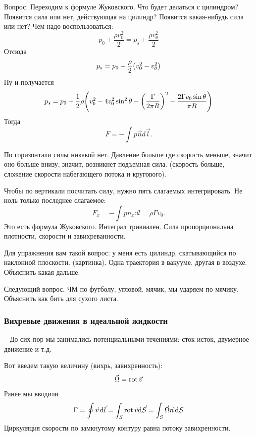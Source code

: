 Вопрос. Переходим к формуле Жуковского. Что будет делаться с цилиндром? Появится сила или нет, действующая на цилиндр? Появится какая-нибудь сила или нет? Чем надо воспользоваться:
\begin{equation}
	p_0+\frac{\rho v_0^2}{2}=p_s+\frac{\rho v_\theta^2}{2}
\end{equation}
Отсюда
\begin{equation}
	p_s=p_0+\frac{\rho}{2}\qty(v_0^2-v_\theta^2)
\end{equation}
Ну и получается
\begin{equation}
	p_s=p_0+\frac12\rho\qty(v_0^2-4v_0^2\sin^2\theta-\qty(\frac{\Gamma}{2\pi R})^2-\frac{2\Gamma v_0\sin\theta}{\pi R})
\end{equation}
Тогда
\begin{equation}
	F=-\int p\vec{n}d\vec{l}.
\end{equation}

По горизонтали силы никакой нет. Давление больше где скорость меньше, значит оно больше внизу, значит, возникнет подъемная сила. (скорость больше, сложение скорости набегающего потока и кругового).

Чтобы по вертикали посчитать силу, нужно пять слагаемых интегрировать. Не ноль только последнее слагаемое:
\begin{equation}
	F_x=-\int p n_x \dd{l}=\rho \Gamma v_0. 
\end{equation}
Это есть формула Жуковского. Интеграл тривиален. Сила пропорциональна плотности, скорости и завихреванности.

Для упражнения вам такой вопрос: у меня есть цилиндр, скатывающийся по наклонной плоскости. (картинка). Одна траектория в вакууме, другая в воздухе. Объяснить какая дальше.

Следующий вопрос. ЧМ по футболу, угловой, мячик, мы ударяем по мячику. Объяснить как бить для сухого листа.

 
\subsubsection{Вихревые движения в идеальной жидкости}\
До сих пор мы занимались потенциальными течениями: сток исток, двумерное движение и т.д.

Вот введем такую величину (вихрь, завихренность):
\begin{equation}
	\vec\Omega=\operatorname{rot} \vec{v}
\end{equation}
Ранее мы вводили 
\begin{equation}
	\Gamma=\oint \vec{v} \,\dd\vec{l}
	=\int_S \operatorname{rot} \vec{v}\dd \vec{S}=\int_S \vec\Omega\vec{n}\,\dd S 
\end{equation}
Циркуляция скорости по замкнутому контуру равна потоку завихренности.

